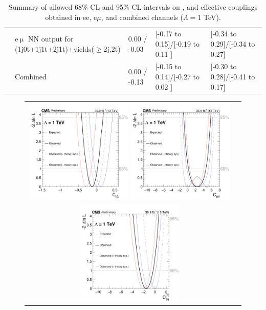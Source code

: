 \begin{table}[h]
{\begin{tabular}{|l|l|l|l|l|}
                              & e$\upmu$   NN output for (1j0t+1j1t+2j1t)+yields($\geq$2j,2t)  & 0.00 / -0.03 &{[}-0.17 to 0.15{]}/{[}-0.19 to 0.11 {]}& {[}-0.34 to 0.29{]}/{[}-0.34 to 0.27{]}\\\cline{2-4}
                              & Combined                                                     & 0.00 / -0.13 &{[}-0.15 to 0.14{]}/{[}-0.27 to 0.02 {]}& {[}-0.30 to 0.28{]}/{[}-0.41 to 0.17{]}\\\hline \hline
\end{tabular}}
\caption{Summary of allowed 68\% CL and 95\% CL intervals on \CtG, \Cphiq and \CtW effective couplings  obtained in ee, e$\mu$, \mumu and combined channels ($\Lambda = 1$ TeV).}
\label{tab:EFT_Limit}
\end{table}

\begin{figure}[ht]
  \begin{center}
    \begin{tabular}{cc}
      \includegraphics[width=0.49\textwidth]{figures/tW/fig/scan_all_plot/Ctg_combined_scan.png}
      \includegraphics[width=0.49\textwidth]{figures/tW/fig/scan_all_plot/Ctw_combined_scan.png}\\
      \includegraphics[width=0.49\textwidth]{figures/tW/fig/scan_all_plot/Cphiq_combined_scan.png}

\end{tabular}
\end{center}
\end{figure}
